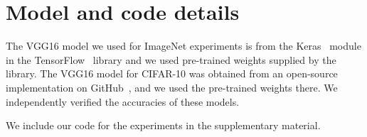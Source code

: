\documentclass{article}
\newcommand{\pl}[1]{}
\begin{document}













% 




\appendix

% 
\newpage 
\section{Model and code details}

The VGG16 model we used for ImageNet experiments is from the Keras~\cite{chollet2015} module in the TensorFlow~\cite{tensorflow2015-whitepaper} library and we used pre-trained weights supplied by the library. The VGG16 model for CIFAR-10 was obtained from an open-source implementation on GitHub~\cite{geifman2017}, and we used the pre-trained weights there. We independently verified the accuracies of these models.

We include our code for the experiments in the supplementary material.












\end{document}
